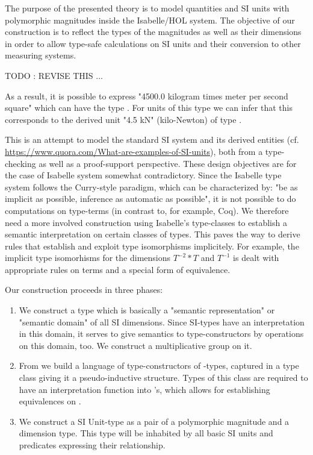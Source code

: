 \documentclass[11pt,a4paper]{book}
\begin{document}
The purpose of the presented theory is to model quantities and SI units with polymorphic magnitudes 
inside the Isabelle/HOL\cite{nipkow.ea:isabelle:2002} system. The objective of our construction is to
reflect the types of the magnitudes as well as their dimensions in order to allow type-safe 
calculations on SI units and their conversion to other measuring systems.


TODO : REVISE THIS ...

As a result, it is possible to express "4500.0 kilogram times meter per second square" which can
have the type 
. 
For units of this type we can infer that this corresponds to the derived unit "4.5 kN" (kilo-Newton) 
 of type .  

This is an attempt to model the standard SI system and its derived entities (cf.
\url{https://www.quora.com/What-are-examples-of-SI-units}),
both from a type-checking as well as a proof-support perspective.
These design objectives are for the case of Isabelle system somewhat contradictory.
Since the Isabelle type system follows the Curry-style paradigm, which can be 
characterized by: "be as implicit as possible, inference as automatic as possible", it is not
possible to do computations on type-terms (in contrast to, for example, Coq). We therefore
need a more involved construction using Isabelle's type-classes to establish a semantic 
interpretation on certain classes of types. This paves the way to derive rules that
establish and exploit type isomorphisms implicitely. For example, the implicit
type isomorhisms for the dimensions $T^{-2} * T$ and $T^{-1}$ is dealt with appropriate
rules on terms and a special form of equivalence. 

Our construction proceeds in three phases:
\begin{enumerate}%
\item We construct a type  which is basically a "semantic representation" or
"semantic domain" of all SI dimensions. Since SI-types have an interpretation in this domain,
it serves to give semantics to type-constructors by operations on this domain, too.
We construct a multiplicative group on it.

\item From  we build a language of type-constructors of -types, 
 captured in a type class  giving it a pseudo-inductive structure. Types of
 this class are required to have  an interpretation function into 's, which
 allows for establishing equivalences on .
      
\item We construct a SI Unit-type as a pair of a polymorphic magnitude and a dimension type.
  This type will be inhabited by all basic SI units and predicates expressing their relationship.
\end{enumerate}%
\end{document}

